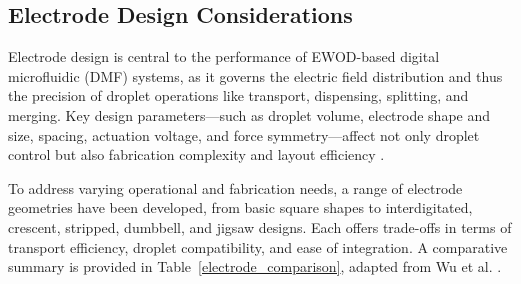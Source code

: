 \documentclass[conference,a4paper]{IEEEtran}
\begin{document}
\subsection{Electrode Design Considerations}
Electrode design is central to the performance of EWOD-based digital microfluidic (DMF) systems, as it governs the electric field distribution and thus the precision of droplet operations like transport, dispensing, splitting, and merging. Key design parameters—such as droplet volume, electrode shape and size, spacing, actuation voltage, and force symmetry—affect not only droplet control but also fabrication complexity and layout efficiency \cite{guanStrippedElectrodeBased2020,wuResearchProgressElectrode2023,chenDigitalMicrofluidicsChip2015,dimovElectrowettingbasedDigitalMicrofluidics2020,sukthangRapidFabricationCloseTyped2020,abadianHybridPaperbasedMicrofluidics2017,al-lababidiMinimumMovableDroplet2023,huOptimizationElectrodeShape2024,sohailJigsawElectrodeDesign2019}.

To address varying operational and fabrication needs, a range of electrode geometries have been developed, from basic square shapes to interdigitated, crescent, stripped, dumbbell, and jigsaw designs. Each offers trade-offs in terms of transport efficiency, droplet compatibility, and ease of integration. A comparative summary is provided in Table~\ref{electrode_comparison}, adapted from Wu et al. \cite{wuResearchProgressElectrode2023}.
\end{document}
